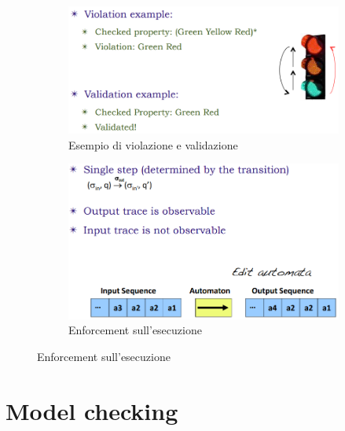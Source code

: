 \documentclass[a4paper,oneside,titlepage]{book}
\begin{document}
\begin{figure}[htp]
	\begin{subfigure}{0.49\textwidth}
	    \centering
		\includegraphics[width=\textwidth, height=\textheight, keepaspectratio]{monitor5.png}
		\caption{Esempio di violazione e validazione}
	\end{subfigure}
	\hfill
	\begin{subfigure}{0.49\textwidth}
	    \centering
		\includegraphics[width=\textwidth, height=\textheight, keepaspectratio]{monitor6.png}
		\caption{Enforcement sull'esecuzione}
	\end{subfigure}
\end{figure}


\chapter{Model checking}
\end{document}
